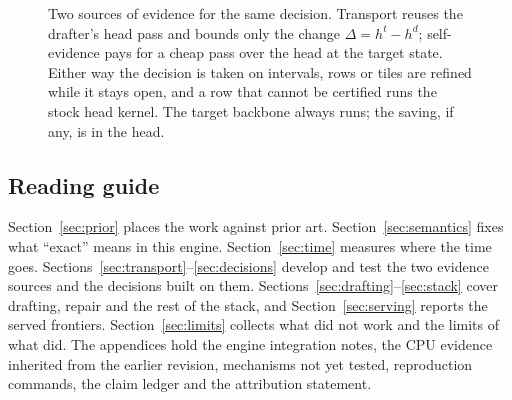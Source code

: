 \begin{figure}[tbp]
\centering
{}
\caption{Two sources of evidence for the same decision. Transport reuses the drafter's head pass and bounds only the change $\Delta=h^t-h^d$; self-evidence pays for a cheap pass over the head at the target state. Either way the decision is taken on intervals, rows or tiles are refined while it stays open, and a row that cannot be certified runs the stock head kernel. The target backbone always runs; the saving, if any, is in the head.}
\label{fig:flow}
\end{figure}

\subsection{Reading guide}
Section~\ref{sec:prior} places the work against prior art. Section~\ref{sec:semantics} fixes what ``exact'' means in this engine. Section~\ref{sec:time} measures where the time goes. Sections~\ref{sec:transport}--\ref{sec:decisions} develop and test the two evidence sources and the decisions built on them. Sections~\ref{sec:drafting}--\ref{sec:stack} cover drafting, repair and the rest of the stack, and Section~\ref{sec:serving} reports the served frontiers. Section~\ref{sec:limits} collects what did not work and the limits of what did. The appendices hold the engine integration notes, the CPU evidence inherited from the earlier revision, mechanisms not yet tested, reproduction commands, the claim ledger and the attribution statement.
